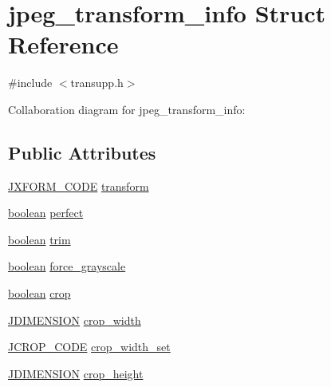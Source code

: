\hypertarget{structjpeg__transform__info}{}\section{jpeg\+\_\+transform\+\_\+info Struct Reference}
\label{structjpeg__transform__info}


{\ttfamily \#include $<$transupp.\+h$>$}



Collaboration diagram for jpeg\+\_\+transform\+\_\+info\+:
\subsection*{Public Attributes}
\begin{DoxyCompactItemize}
\item 
\hyperlink{transupp_8h_a1133cd2487f1134aed16868dc1f04315}{J\+X\+F\+O\+R\+M\+\_\+\+C\+O\+D\+E} \hyperlink{structjpeg__transform__info_aa3227394d9b01bae8543faf79e9c5fe8}{transform}
\item 
\hyperlink{jmorecfg_8h_a7c6368b321bd9acd0149b030bb8275ed}{boolean} \hyperlink{structjpeg__transform__info_a6cefe762b48d689b0b805dd5c3be75fd}{perfect}
\item 
\hyperlink{jmorecfg_8h_a7c6368b321bd9acd0149b030bb8275ed}{boolean} \hyperlink{structjpeg__transform__info_a4f1f979322463d2c02a307047f0cf6b7}{trim}
\item 
\hyperlink{jmorecfg_8h_a7c6368b321bd9acd0149b030bb8275ed}{boolean} \hyperlink{structjpeg__transform__info_a26d925edb18e0095056b38312fb86e53}{force\+\_\+grayscale}
\item 
\hyperlink{jmorecfg_8h_a7c6368b321bd9acd0149b030bb8275ed}{boolean} \hyperlink{structjpeg__transform__info_a9c2edc10e30220708a48c93422841dc4}{crop}
\item 
\hyperlink{jmorecfg_8h_a04ed4674f6f1d0d50ec241531e38274f}{J\+D\+I\+M\+E\+N\+S\+I\+O\+N} \hyperlink{structjpeg__transform__info_aa7669467cf9562283cfc92df23798035}{crop\+\_\+width}
\item 
\hyperlink{transupp_8h_a8286e58d1d84a5e78d711cd37e9b68a2}{J\+C\+R\+O\+P\+\_\+\+C\+O\+D\+E} \hyperlink{structjpeg__transform__info_a8f5206aab70a3ff0b0acc94cb8692b4c}{crop\+\_\+width\+\_\+set}
\item 
\hyperlink{jmorecfg_8h_a04ed4674f6f1d0d50ec241531e38274f}{J\+D\+I\+M\+E\+N\+S\+I\+O\+N} \hyperlink{structjpeg__transform__info_a0ed85b4df9f3feaeff5cf31252b0a0dd}{crop\+\_\+height}
\item 

\end{DoxyCompactItemize}
